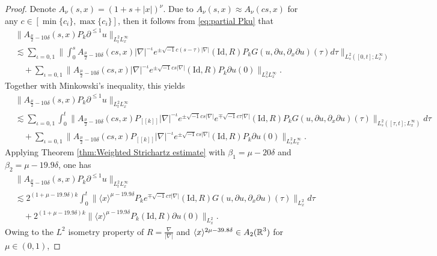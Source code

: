 \documentclass[11pt,twoside]{article}
\def\R{\mathop{\mathbb R\kern 0pt}\nolimits}
\def\f{\frac}
\def\p{\partial}
\def\ls{\lesssim}
\newcommand{\w}[1]{\langle {#1} \rangle}
\theoremstyle{plain}
\theoremstyle{definition}
\numberwithin{equation}{section}
\begin{document}
\begin{proof}
	Denote $A_\nu(s,x)=(1+s+|x|)^{\nu}$. Due to $A_\nu(s,x)\approx A_\nu(cs,x) $ for any $c\in[\min\{c_i\},\max\{c_i\}]$,
then it follows from \eqref{eq:partial Pku} that
	\begin{equation}\label{3.16}
	\begin{split}
	&\|A_{\f{\mu}{2}-10\delta}(s,x)P_k\p^{\le 1} u\|_{L^{2}_tL^\infty_x}\\
	&\ls
	\sum_{\iota=0,1}\big\|\int_{0}^{s} A_{\f{\mu}{2}-10\delta}(cs,x)|\nabla|^{-\iota}e^{\pm \sqrt{-1}c(s-\tau)|\nabla|} (\mathrm{Id},R) P_k G(u,\p u,\p_x\p u)(\tau)d\tau\big\|_{L^{2}_s([0,t];L^\infty_x)}\\
	&\quad+\sum_{\iota=0,1}\|A_{\f{\mu}{2}-10\delta}(cs,x)|\nabla|^{-\iota}e^{\pm \sqrt{-1}cs|\nabla|}(\mathrm{Id},R) P_k\partial u(0)\|_{L^{2}_sL^\infty_x}.
	\end{split}
	\end{equation}
	Together with Minkowski's inequality, this yields
	\begin{equation*}
	\begin{split}
	&\|A_{\f{\mu}{2}-10\delta}(s,x)P_k\p^{\le 1} u\|_{L^{2}_tL^\infty_x}\\
	&\ls
	\sum_{\iota=0,1}\int_{0}^{t} \big\|A_{\f{\mu}{2}-10\delta}(cs,x)P_{[[k]]}|\nabla|^{-\iota}e^{\pm \sqrt{-1}cs|\nabla|} e^{\mp \sqrt{-1}c\tau|\nabla|} (\mathrm{Id},R)
	 P_kG(u,\p u,\p_x\p u)(\tau)\big\|_{L^{2}_s([\tau,t];L^\infty_x)}d\tau\\
	&\quad+\sum_{\iota=0,1}\|A_{\f{\mu}{2}-10\delta}(cs,x)P_{[[k]]}|\nabla|^{-\iota}e^{\pm \sqrt{-1}cs|\nabla|} (\mathrm{Id},R)P_k\partial u(0)\|_{L^{2}_sL^\infty_x}.
	\end{split}
	\end{equation*}
	Applying Theorem \ref{thm:Weighted Strichartz estimate} with $\beta_1={\mu-20\delta}$ and $\beta_2=\mu-19.9\delta$, one has
	\begin{equation}\label{3.19}
	\begin{split}
	&\|A_{\f{\mu}{2}-10\delta}(s,x)P_k\p^{\le 1} u\|_{L^{2}_tL^\infty_x}\\
	&\ls
	2^{(1+\mu-19.9\delta) k}
	\int_{0}^{t}\big\|\w{x}^{\mu-19.9\delta}P_ke^{\mp \sqrt{-1}c\tau|\nabla|} (\mathrm{Id},R) G(u,\p u,\p_x\p u)(\tau)\big\|_{L^2_x}d\tau\\
	&\quad+2^{(1+\mu-19.9\delta) k}
	\|\w{x}^{\mu-19.9\delta}P_k(\mathrm{Id},R)\partial u(0)\|_{L^2_x}.
	\end{split}
	\end{equation}
	Owing to the $L^2$ isometry property of $R = \f{\nabla}{|\nabla|}$ and $\w{x}^{2\mu-39.8\delta}\in A_2(\R^3)$ for $\mu\in(0,1)$,

\end{proof}
\end{document}
